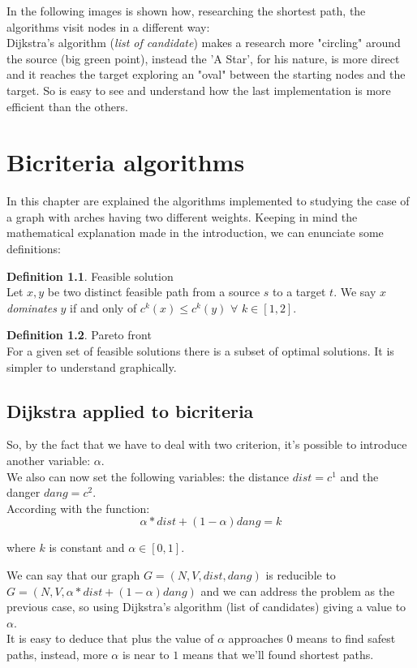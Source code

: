 \documentclass[a4paper,11pt]{report}
\begin{document}
In the following images is shown how, researching the shortest path, the algorithms visit nodes in a different way:\\
Dijkstra's algorithm (\textit{list of candidate}) makes a research more "circling" around the source (big green point), instead the 'A Star', for his nature, is more direct and it reaches the target exploring an "oval" between the starting nodes and the target. So is easy to see and understand how the last implementation is more efficient than the others.  

\chapter{Bicriteria algorithms}

In this chapter are explained the algorithms implemented to studying the case of a graph with arches having two different weights.
Keeping in mind the mathematical explanation made in the introduction, we can enunciate some definitions:

\theoremstyle{definition}
\newtheorem{definition}{Definition}
\begin{definition}{Feasible solution}\\
	Let $x, y$ be two distinct feasible path from a source $s$ to a target $t$. We say $x$ \emph{dominates} $y$ if and only of $c^k(x) \leq c^k(y)$ $\forall$ $k \in [1,2]$.
\end{definition}

\theoremstyle{definition}
\begin{definition}{Pareto front}\\
	For a given set of feasible solutions there is a subset of optimal solutions. It is simpler to understand graphically.
\end{definition}

\section{Dijkstra applied to bicriteria}
So, by the fact that we have to deal with two criterion, it's possible to introduce another variable: $\alpha$.\\
We also can now set the following variables: the distance $dist=c^1$ and the danger $dang=c^2$.\\
According with the function: 
\begin{equation}\label{eq:pareto front}
	\alpha*dist + (1-\alpha) dang = k
\end{equation}
\begin{center}
	where $k$ is constant and $\alpha \in [0, 1]$.
\end{center}
We can say that our graph $G=(N,V,dist,dang)$ is reducible to $G=(N,V,\alpha*dist + (1-\alpha) dang)$ and we can address the problem as the previous case, so using Dijkstra's algorithm (list of candidates) giving a value to $\alpha$.\\
It is easy to deduce that plus the value of $\alpha$ approaches $0$ means to find safest paths, instead, more $\alpha$ is near to $1$ means that we'll found shortest paths.
\end{document}
